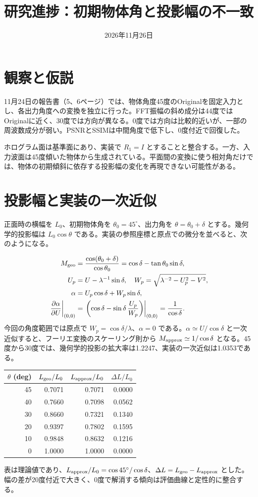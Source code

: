 \documentclass[a4paper,10pt]{ltjsarticle}
\title{研究進捗：初期物体角と投影幅の不一致}
\author{}
\date{2026年11月26日}
\begin{document}
\maketitle
\section{観察と仮説}
11月24日の報告書（5、6ページ）では、物体角度45度のOriginalを固定入力とし、各出力角度への変換を独立に行った。FFT振幅の斜め成分は44度ではOriginalに近く、30度では方向が異なる。0度では方向は比較的近いが、一部の周波数成分が弱い。PSNRとSSIMは中間角度で低下し、0度付近で回復した。

ホログラム面は基準面にあり、実装で $R_1=I$ とすることと整合する。一方、入力波面は45度傾いた物体から生成されている。平面間の変換に使う相対角だけでは、物体の初期傾斜に依存する投影幅の変化を再現できない可能性がある。

\section{投影幅と実装の一次近似}
正面時の横幅を $L_0$、初期物体角を $\theta_0=45^\circ$、出力角を $\theta=\theta_0+\delta$ とする。幾何学的投影幅は $L_0\cos\theta$ である。実装の参照座標と原点での微分を並べると、次のようになる。

\begin{align}
M_{\rm geo} &= \frac{\cos(\theta_0+\delta)}{\cos\theta_0}
             =\cos\delta-\tan\theta_0\sin\delta,\\
U_p &= U-\lambda^{-1}\sin\delta,\quad
W_p=\sqrt{\lambda^{-2}-U_p^2-V^2},\\
\alpha &= U_p\cos\delta+W_p\sin\delta,\\
\left.\frac{\partial\alpha}{\partial U}\right|_{(0,0)}
 &=\left.\left(\cos\delta-\sin\delta\,\frac{U_p}{W_p}\right)\right|_{(0,0)}
 =\frac{1}{\cos\delta}.
\end{align}
今回の角度範囲では原点で $W_p=\cos\delta/\lambda$、$\alpha=0$ である。$\alpha\simeq U/\cos\delta$ と一次近似すると、フーリエ変換のスケーリング則から $M_{\rm approx}\simeq1/\cos\delta$ となる。45度から30度では、幾何学的投影の拡大率は1.2247、実装の一次近似は1.0353である。

\begin{center}
\begin{tabular}{rrrr}\toprule
$\theta$ (deg) & $L_{\rm geo}/L_0$ & $L_{\rm approx}/L_0$ & $\Delta L/L_0$\\\midrule
45 & 0.7071 & 0.7071 & 0.0000\\
40 & 0.7660 & 0.7098 & 0.0562\\
30 & 0.8660 & 0.7321 & 0.1340\\
20 & 0.9397 & 0.7802 & 0.1595\\
10 & 0.9848 & 0.8632 & 0.1216\\
0  & 1.0000 & 1.0000 & 0.0000\\\bottomrule
\end{tabular}
\end{center}
表は理論値であり、$L_{\rm approx}/L_0=\cos45^\circ/\cos\delta$、$\Delta L=L_{\rm geo}-L_{\rm approx}$ とした。幅の差が20度付近で大きく、0度で解消する傾向は評価曲線と定性的に整合する。
\end{document}
